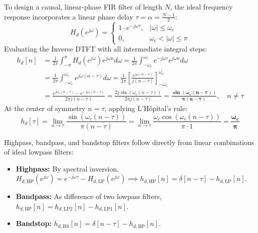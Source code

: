\documentclass[11pt,a4paper]{article}
\begin{document}
To design a causal, linear-phase FIR filter of length $N$, the ideal frequency response incorporates a linear phase delay $\tau = \alpha = \frac{N-1}{2}$:
\begin{equation}
H_d(e^{j\omega}) = \begin{cases} 1 \cdot e^{-j\omega\tau}, & |\omega| \le \omega_c \\ 0, & \omega_c < |\omega| \le \pi \end{cases}
\end{equation}
Evaluating the Inverse DTFT with all intermediate integral steps:
\begin{align}
h_d[n] &= \frac{1}{2\pi} \int_{-\pi}^{\pi} H_d(e^{j\omega}) e^{j\omega n} d\omega = \frac{1}{2\pi} \int_{-\omega_c}^{\omega_c} e^{-j\omega\tau} e^{j\omega n} d\omega \nonumber \\
&= \frac{1}{2\pi} \int_{-\omega_c}^{\omega_c} e^{j\omega(n - \tau)} d\omega = \frac{1}{2\pi} \left[ \frac{e^{j\omega(n - \tau)}}{j(n - \tau)} \right]_{-\omega_c}^{\omega_c} \nonumber \\
&= \frac{e^{j\omega_c(n-\tau)} - e^{-j\omega_c(n-\tau)}}{2\pi j(n-\tau)} = \frac{2j\sin(\omega_c(n-\tau))}{2\pi j(n-\tau)} = \mathbf{\frac{\sin(\omega_c(n-\tau))}{\pi(n-\tau)}}, \quad n \ne \tau
\end{align}
At the center of symmetry $n = \tau$, applying L'H\^opital's rule:
\begin{equation}
h_d[\tau] = \lim_{n \to \tau} \frac{\sin(\omega_c(n-\tau))}{\pi(n-\tau)} = \lim_{n \to \tau} \frac{\omega_c\cos(\omega_c(n-\tau))}{\pi \cdot 1} = \mathbf{\frac{\omega_c}{\pi}}
\end{equation}

Highpass, bandpass, and bandstop filters follow directly from linear combinations of ideal lowpass filters:
\begin{itemize}
    \item \textbf{Highpass:} By spectral inversion, $H_{d,\text{HP}}(e^{j\omega}) = e^{-j\omega\tau} - H_{d,\text{LP}}(e^{j\omega}) \implies h_{d,\text{HP}}[n] = \delta[n-\tau] - h_{d,\text{LP}}[n]$.
    \item \textbf{Bandpass:} As difference of two lowpass filters, $h_{d,\text{BP}}[n] = h_{d,\text{LP2}}[n] - h_{d,\text{LP1}}[n]$.
    \item \textbf{Bandstop:} $h_{d,\text{BS}}[n] = \delta[n-\tau] - h_{d,\text{BP}}[n]$.
\end{itemize}
\end{document}
